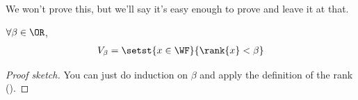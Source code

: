 We won't prove this, but we'll say it's easy enough to prove and leave it at that.

\begin{boxproposition}
    $\forall \beta \in \OR$,
    \begin{align*}
        V_{\beta} = \setst{x \in \WF}{\rank{x} < \beta}
    \end{align*}
\end{boxproposition}
\begin{proof}[Proof sketch]
    You can just do induction on $\beta$ and apply the definition of the rank ().
\end{proof}